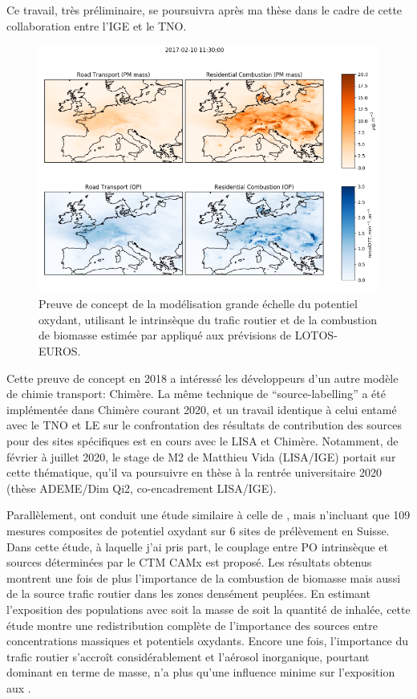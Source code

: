 Ce travail, très préliminaire, se poursuivra après ma thèse dans le cadre de cette
collaboration entre l'IGE et le TNO.

\begin{figure}[ht]
    \centering
    \includegraphics[width=0.8\linewidth]{figures/chapter05/OPmap.png}
    \caption{Preuve de concept de la modélisation grande échelle du potentiel oxydant,
    utilisant le \PODTT{} intrinsèque du trafic routier et de la combustion de biomasse
estimée par \cite{weberSourceinprep.} appliqué aux prévisions de LOTOS-EUROS.}%
    \label{fig:OPmap}
\end{figure}

Cette preuve de concept en 2018 a intéressé les développeurs
d'un autre modèle de chimie transport: Chimère. La
même technique de ``source-labelling'' a été implémentée dans Chimère courant 2020, et un
travail identique à celui entamé avec le TNO
et LE sur le confrontation des résultats de contribution des sources pour des sites
spécifiques est en cours avec le LISA et Chimère. Notamment, de février à juillet 2020, le
stage de M2 de Matthieu Vida (LISA/IGE) portait sur cette thématique, qu'il va poursuivre en thèse à
la rentrée universitaire 2020 (thèse ADEME/Dim Qi2, co-encadrement LISA/IGE).

Parallèlement, \cite{daellenbachSourcessubmitted} ont conduit une étude similaire à celle
de \cite{weberSourceinprep.}, mais n'incluant que 109 mesures composites de potentiel
oxydant sur 6 sites de prélèvement en Suisse. Dans cette étude, à laquelle j'ai pris
part, le couplage entre PO intrinsèque et sources déterminées par le CTM CAMx est proposé.
Les résultats obtenus montrent une fois de plus
l'importance de la combustion de biomasse mais aussi de la source trafic routier dans
les zones densément peuplées. En estimant l'exposition des populations avec soit la masse de
\PMdix{} soit la quantité de \POv{} inhalée, cette étude montre une
redistribution complète de l'importance des sources entre concentrations massiques et
potentiels oxydants. Encore une fois, l'importance du trafic routier s'accroît
considérablement et l'aérosol inorganique, pourtant dominant en terme de masse, n'a plus
qu'une influence minime sur l'exposition aux \POv.

